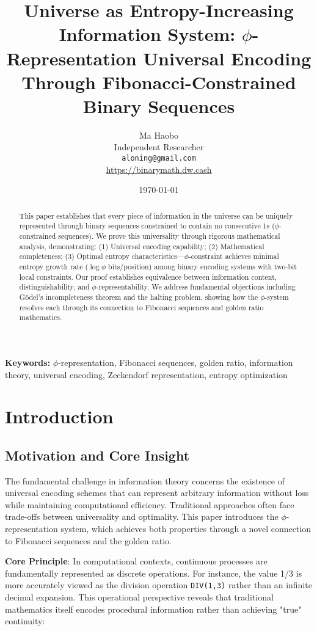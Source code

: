 \documentclass[12pt,letterpaper]{article}
\title{Universe as Entropy-Increasing Information System: $\phi$-Representation Universal Encoding Through Fibonacci-Constrained Binary Sequences}
\author{Ma Haobo\\
Independent Researcher\\
\texttt{aloning@gmail.com}\\
\url{https://binarymath.dw.cash}}
\date{\today}
\begin{document}
\maketitle

\begin{abstract}
This paper establishes that every piece of information in the universe can be uniquely represented through binary sequences constrained to contain no consecutive 1s ($\phi$-constrained sequences). We prove this universality through rigorous mathematical analysis, demonstrating: (1) Universal encoding capability; (2) Mathematical completeness; (3) Optimal entropy characteristics—$\phi$-constraint achieves minimal entropy growth rate ($\log \phi$ bits/position) among binary encoding systems with two-bit local constraints. Our proof establishes equivalence between information content, distinguishability, and $\phi$-representability. We address fundamental objections including Gödel's incompleteness theorem and the halting problem, showing how the $\phi$-system resolves each through its connection to Fibonacci sequences and golden ratio mathematics.
\end{abstract}

\textbf{Keywords:} $\phi$-representation, Fibonacci sequences, golden ratio, information theory, universal encoding, Zeckendorf representation, entropy optimization

\thispagestyle{empty}
\newpage

\tableofcontents
\newpage

\section{Introduction}

\subsection{Motivation and Core Insight}

The fundamental challenge in information theory concerns the existence of universal encoding schemes that can represent arbitrary information without loss while maintaining computational efficiency. Traditional approaches often face trade-offs between universality and optimality. This paper introduces the $\phi$-representation system, which achieves both properties through a novel connection to Fibonacci sequences and the golden ratio.

\textbf{Core Principle}: In computational contexts, continuous processes are fundamentally represented as discrete operations. For instance, the value 1/3 is more accurately viewed as the division operation \texttt{DIV(1,3)} rather than an infinite decimal expansion. This operational perspective reveals that traditional mathematics itself encodes procedural information rather than achieving "true" continuity:
\end{document}

